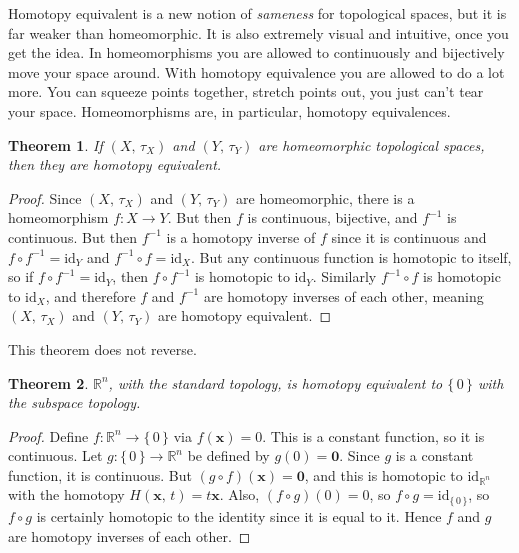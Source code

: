 \documentclass{article}
\theoremstyle{plain}
\newtheorem{theorem}{Theorem}[section]
\theoremstyle{normal}
\begin{document}
        Homotopy equivalent is a new notion of \textit{sameness} for topological
        spaces, but it is far weaker than homeomorphic. It is also extremely
        visual and intuitive, once you get the idea. In homeomorphisms you are
        allowed to continuously and bijectively move your space around. With
        homotopy equivalence you are allowed to do a lot more. You can squeeze
        points together, stretch points out, you just can't tear your space.
        Homeomorphisms are, in particular, homotopy equivalences.
        \begin{theorem}
            If $(X,\,\tau_{X})$ and $(Y,\,\tau_{Y})$ are homeomorphic
            topological spaces, then they are homotopy equivalent.
        \end{theorem}
        \begin{proof}
            Since $(X,\,\tau_{X})$ and $(Y,\,\tau_{Y})$ are homeomorphic, there
            is a homeomorphism $f:X\rightarrow{Y}$. But then $f$ is continuous,
            bijective, and $f^{-1}$ is continuous. But then $f^{-1}$ is a
            homotopy inverse of $f$ since it is continuous and
            $f\circ{f}^{-1}=\textrm{id}_{Y}$ and
            $f^{-1}\circ{f}=\textrm{id}_{X}$. But any continuous function is
            homotopic to itself, so if $f\circ{f}^{-1}=\textrm{id}_{Y}$, then
            $f\circ{f}^{-1}$ is homotopic to $\textrm{id}_{Y}$. Similarly
            $f^{-1}\circ{f}$ is homotopic to $\textrm{id}_{X}$, and therefore
            $f$ and $f^{-1}$ are homotopy inverses of each other, meaning
            $(X,\,\tau_{X})$ and $(Y,\,\tau_{Y})$ are homotopy equivalent.
        \end{proof}
        This theorem does not reverse.
        \begin{theorem}
            $\mathbb{R}^{n}$, with the standard topology, is homotopy equivalent
            to $\{\,0\,\}$ with the subspace topology.
        \end{theorem}
        \begin{proof}
            Define $f:\mathbb{R}^{n}\rightarrow\{\,0\,\}$ via
            $f(\mathbf{x})=0$. This is a constant function, so it is continuous.
            Let $g:\{\,0\,\}\rightarrow\mathbb{R}^{n}$ be defined by
            $g(0)=\mathbf{0}$. Since $g$ is a constant function, it is
            continuous. But $(g\circ{f})(\mathbf{x})=\mathbf{0}$, and this
            is homotopic to $\textrm{id}_{\mathbb{R}^{n}}$ with the homotopy
            $H(\mathbf{x},\,t)=t\mathbf{x}$. Also,
            $(f\circ{g})(0)=0$, so $f\circ{g}=\textrm{id}_{\{\,0\,\}}$, so
            $f\circ{g}$ is certainly homotopic to the identity since it is
            equal to it. Hence $f$ and $g$ are homotopy inverses of each other.
        \end{proof}
\end{document}
